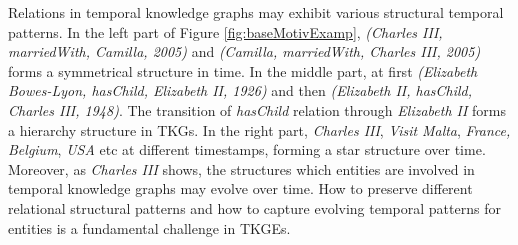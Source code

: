 \documentclass[letterpaper]{article} %
\begin{document}
Relations in temporal knowledge graphs may exhibit various structural temporal patterns. In the left part of Figure \ref{fig:baseMotivExamp}, \textit{(Charles III, marriedWith, Camilla, 2005)} and \textit{(Camilla, marriedWith, Charles III, 2005)} forms a symmetrical structure in time.
In the middle part, at first \textit{(Elizabeth Bowes-Lyon, hasChild, Elizabeth II, 1926)} and then \textit{(Elizabeth II, hasChild, Charles III, 1948)}. The transition of \textit{hasChild} relation through \textit{Elizabeth II} forms a hierarchy structure in TKGs.
In the right part, \textit{Charles III}, \textit{Visit} \textit{Malta}, \textit{France, Belgium}, \textit{USA} etc at different timestamps, forming a star structure over time.
Moreover, as \textit{Charles III} shows, the structures which entities are involved in temporal knowledge graphs may evolve over time. 
How to preserve different relational structural patterns and how to capture evolving temporal patterns for entities is a fundamental challenge in TKGEs. 
\end{document}
